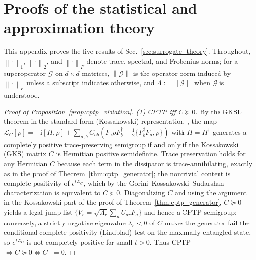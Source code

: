 \documentclass[twocolumn,aps,prxquantum,superscriptaddress,nofootinbib,floatfix,longbibliography]{revtex4-2}
\newcommand{\calG}{\mathcal{G}}
\newcommand{\calL}{\mathcal{L}}
\newcommand{\ii}{\mathrm{i}}
\newcommand{\norm}[1]{\left\lVert #1 \right\rVert}
\begin{document}
\section{Proofs of the statistical and approximation theory}
\label{sec:appendix_surrogate_proofs}

This appendix proves the five results of Sec.~\ref{sec:surrogate_theory}. Throughout, $\norm{\cdot}_1$, $\norm{\cdot}_2$, and $\norm{\cdot}_F$ denote trace, spectral, and Frobenius norms; for a superoperator $\calG$ on $d\times d$ matrices, $\norm{\calG}$ is the operator norm induced by $\norm{\cdot}_F$ unless a subscript indicates otherwise, and $\Lambda:=\norm{\calG}$ when $\calG$ is understood.

\begin{proof}[Proof of Proposition~\ref{prop:cptp_violation}]
\emph{(1) CPTP iff $C\succeq0$.} By the GKSL theorem in the standard-form (Kossakowski) representation~\cite{gorini1976completely,breuer2002theory}, the map $\calL_C[\rho]=-\ii[H,\rho]+\sum_{a,b}C_{ab}(F_a\rho F_b^\dagger-\tfrac12\{F_b^\dagger F_a,\rho\})$ with $H=H^\dagger$ generates a completely positive trace-preserving semigroup if and only if the Kossakowski (GKS) matrix $C$ is Hermitian positive semidefinite. Trace preservation holds for any Hermitian $C$ because each term in the dissipator is trace-annihilating, exactly as in the proof of Theorem~\ref{thm:cptp_generator}; the nontrivial content is complete positivity of $e^{t\calL_C}$, which by the Gorini--Kossakowski--Sudarshan characterization is equivalent to $C\succeq0$. Diagonalizing $C$ and using the argument in the Kossakowski part of the proof of Theorem~\ref{thm:cptp_generator}, $C\succeq0$ yields a legal jump list $\{V_r=\sqrt{\Lambda_r}\sum_aU_{ar}F_a\}$ and hence a CPTP semigroup; conversely, a strictly negative eigenvalue $\lambda_r<0$ of $C$ makes the generator fail the conditional-complete-positivity (Lindblad) test on the maximally entangled state, so $e^{t\calL_C}$ is not completely positive for small $t>0$. Thus CPTP $\iff C\succeq0\iff C_-=0$.


\end{proof}
\end{document}
